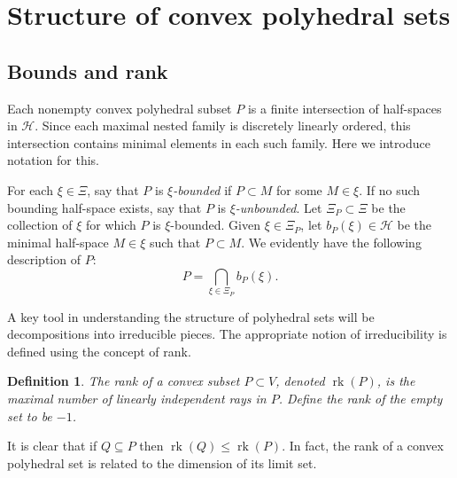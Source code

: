 \documentclass[11pt]{amsart}
\newtheorem{definition}[theorem]{Definition}
\numberwithin{table}{section}
\numberwithin{figure}{section}
\theoremstyle{remark}
\DeclareMathOperator{\rk}{rk}
\begin{document}
\section{Structure of convex polyhedral sets}



\subsection{Bounds and rank}

Each nonempty convex polyhedral subset $P$ is a finite intersection of
half-spaces in $\mathcal{H}$. Since each maximal nested family is
discretely linearly ordered, this intersection contains minimal
elements in each such family. Here we introduce notation for this.

For each $\xi \in \Xi$, say that $P$ is {\em $\xi$-bounded} if
$P\subset M$ for some $M\in \xi$. If no such bounding half-space
exists, say that $P$ is {\em $\xi$-unbounded}. Let
$\Xi_P \subset \Xi$ be the collection of $\xi$ for which $P$ is
$\xi$-bounded. Given $\xi \in \Xi_P$, let
$b_P(\xi) \in \mathcal{H}$ be the minimal half-space $M\in \xi$
such that $P \subset M$. We evidently have the following description
of $P$:
\begin{equation}\label{eq:piecebounds}
  P = \bigcap_{\xi \in \Xi_P} b_P(\xi).
\end{equation}

A key tool in understanding the structure of polyhedral sets will be
decompositions into irreducible pieces. The appropriate notion of
irreducibility is defined using the concept of rank.

\begin{definition}
  The {\em rank} of a convex subset $P \subset V$, denoted $\rk(P)$,
  is the maximal number of linearly independent rays in $P$. Define
  the {\em rank} of the empty set to be $-1$.
\end{definition}

It is clear that if $Q\subseteq P$ then $\rk(Q)\leq \rk(P)$.  In fact,
the rank of a convex polyhedral set is related to the dimension of its
limit set.
\end{document}
